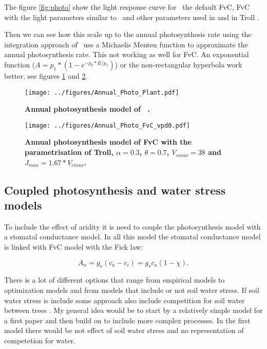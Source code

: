 \documentclass[a4paper,11pt]{article}
\begin{document}
The figure \ref{fig:photo} show the light response curve for \plant\ the default FvC, FvC with the light parameters similar to \plant\ and other parameters used in \citet{Sterck-2011} and in Troll \citep{Marechaux-2017}.

Then we can see how this scale up to the annual photosynthesis rate using the integration approach of \plant\. \plant\ use a Michaelis Menten function to approximate the annual photosynthesis rate. This not working as well for FvC. An exponential function \citep{Chen-2016} ($A = p_1 *(1-e^{-p_2* E/p_1})$) or the non-rectangular hyperbola work better, see figures \ref{fig:photo_annu_plant} and \ref{fig:photo_annu_fvc}. 


\begin{figure}[ht]
\centering
\texttt{[image: ../figures/Annual\_Photo\_Plant.pdf]}
\caption{\textbf{Annual photosynthesis model of \plant\ .}
\label{fig:photo_annu_plant}}
\end{figure}


\begin{figure}[ht]
\centering
\texttt{[image: ../figures/Annual\_Photo\_FvC\_vpd0.pdf]}
\caption{\textbf{Annual photosynthesis model of FvC with the parametrisation of Troll, $\alpha = 0.3$, $\theta = 0.7$, $V_{cmax} = 38$ and $J_{max} = 1.67 * V_{cmax}$.}
\label{fig:photo_annu_fvc}}
\end{figure}

\clearpage

\subsection{Coupled photosynthesis and water stress models}

To include the effect of aridity it is need to couple the photosynthesis model with a stomatal conductance model. In all this model the stomatal conductance model is linked with FvC model with the Fick law:

\begin{equation}
\label{eq:fick}
A_n = g_s (c_a - c_i) = g_s c_a (1-\chi).
\end{equation}

There is a lot of different options that range from empirical models to optimization models and from models that include or not soil water stress. If soil water stress is include some approach also include competition for soil water between trees \citep{Farrior-2013}. My general idea would be to start by a relatively simple model for a first paper and then build on to include more complex processes. In the first model there would be not effect of soil water stress and no representation of competetion for water.
\end{document}
